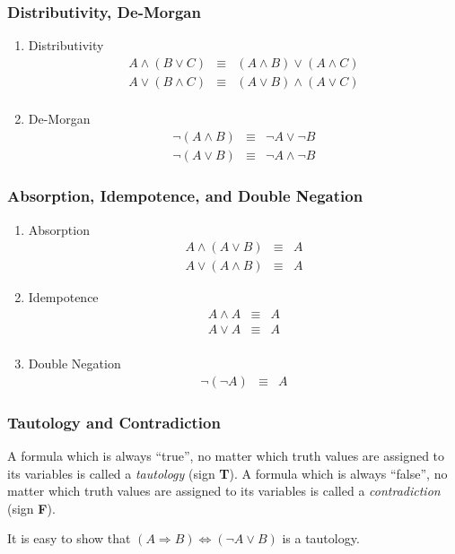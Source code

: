 \documentclass{beamer}
\theoremstyle{remark}
\begin{document}
\begin{frame}
\frametitle{Distributivity, De-Morgan}
\begin{theorem}
\begin{enumerate}
	\item Distributivity	\begin{eqnarray*}
						A \land (B \lor C) & \equiv & (A \land B) \lor (A \land C) \\
						A \lor (B \land C) & \equiv & (A \lor B) \land (A \lor C) \\
					\end{eqnarray*}
	\pause
	\item De-Morgan	\begin{eqnarray*}
						\lnot(A \land B) & \equiv & \lnot A \lor \lnot B \\
						\lnot(A \lor B) & \equiv & \lnot A \land \lnot B
					\end{eqnarray*}
\end{enumerate}
\end{theorem}
\end{frame}

\begin{frame}
\frametitle{Absorption, Idempotence, and Double Negation}
\begin{theorem}
\begin{enumerate}
	\item Absorption	\begin{eqnarray*}
						A \land (A \lor B) & \equiv &  A \\
						A \lor (A \land B) & \equiv &  A 
					\end{eqnarray*}
	\pause
	\item Idempotence	\begin{eqnarray*}
						A \land A & \equiv & A \\
						A \lor A & \equiv & A \\
					\end{eqnarray*}
	\pause
	\item Double Negation \begin{eqnarray*}
		\lnot(\lnot A) & \equiv & A 
	\end{eqnarray*}
\end{enumerate}
\end{theorem}
\end{frame}

\begin{frame}
 \frametitle{Tautology and Contradiction}
 \begin{definition}
 A formula which is always ``true'', no matter which truth values are assigned to its variables is called a {\em tautology} (sign {\bf T}). A formula which is always ``false'', no matter which truth values are assigned to its variables is called a {\em contradiction} (sign {\bf F}).
 \end{definition}
 \pause
\begin{example}
 It is easy to show that $(A \Rightarrow B) \Leftrightarrow (\lnot A \lor B)$ is a tautology.
\end{example}
\end{frame}
\end{document}
